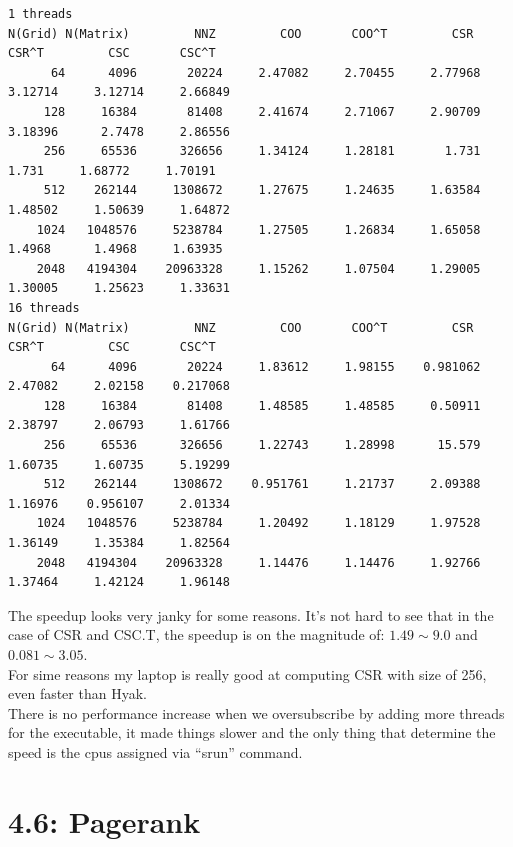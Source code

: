 \documentclass[]{article}
\begin{document}
    \begin{lstlisting}
1 threads   
N(Grid) N(Matrix)         NNZ         COO       COO^T         CSR       CSR^T         CSC       CSC^T
      64      4096       20224     2.47082     2.70455     2.77968     3.12714     3.12714     2.66849
     128     16384       81408     2.41674     2.71067     2.90709     3.18396      2.7478     2.86556
     256     65536      326656     1.34124     1.28181       1.731       1.731     1.68772     1.70191
     512    262144     1308672     1.27675     1.24635     1.63584     1.48502     1.50639     1.64872
    1024   1048576     5238784     1.27505     1.26834     1.65058      1.4968      1.4968     1.63935
    2048   4194304    20963328     1.15262     1.07504     1.29005     1.30005     1.25623     1.33631
16 threads  
N(Grid) N(Matrix)         NNZ         COO       COO^T         CSR       CSR^T         CSC       CSC^T
      64      4096       20224     1.83612     1.98155    0.981062     2.47082     2.02158    0.217068
     128     16384       81408     1.48585     1.48585     0.50911     2.38797     2.06793     1.61766
     256     65536      326656     1.22743     1.28998      15.579     1.60735     1.60735     5.19299
     512    262144     1308672    0.951761     1.21737     2.09388     1.16976    0.956107     2.01334
    1024   1048576     5238784     1.20492     1.18129     1.97528     1.36149     1.35384     1.82564
    2048   4194304    20963328     1.14476     1.14476     1.92766     1.37464     1.42124     1.96148
    \end{lstlisting}
    The speedup looks very janky for some reasons. It's not hard to see that in the case of CSR and CSC.T, the speedup is on the magnitude of: $1.49 \sim 9.0$ and $0.081\sim 3.05$. 
    \\
    For sime reasons my laptop is really good at computing CSR with size of 256, even faster than Hyak. 
    \\
    There is no performance increase when we oversubscribe by adding more threads for the executable, it made things slower and the only thing that determine the speed is the cpus assigned via ``srun'' command. 
\section*{4.6: Pagerank}
\end{document}
